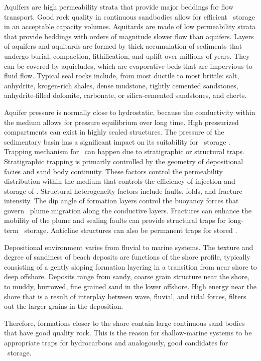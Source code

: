 Aquifers are high permeability strata that provide major beddings for flow transport. Good rock quality in continuous sandbodies allow for efficient \coo\ storage in an acceptable capacity volumes. Aquitards are made of low permeability strata that provide beddings with orders of magnitude slower flow than aquifers. Layers of aquifers and aquitards are formed by thick accumulation of sediments that undergo burial, compaction, lithification, and uplift over millions of years. They can be covered by aquicludes, which are evaporative beds that are impervious to fluid flow. Typical seal rocks include, from most ductile to most brittle: salt, anhydrite, krogen-rich shales, dense mudstone, tightly cemented sandstones, anhydrite-filled dolomite, carbonate, or silica-cemented sandstones, and cherts.

Aquifer pressure is normally close to hydrostatic, because the conductivity within the medium allows for pressure equilibrium over long time. High pressurized compartments can exist in highly sealed structures. The pressure of the sedimentary basin has a significant impact on its suitability for \coo\ storage \cite{bachu2000sequestration}. Trapping mechanism for \coo\ can happen due to stratigraphic or structural traps. Stratigraphic trapping  is primarily controlled by the geometry of depositional facies and sand body continuity. These factors control the permeability distribution within the medium that controls the efficiency of injection and storage of \coo. Structural heterogeneity factors include faults, folds, and fracture intensity. The dip angle of formation layers control the buoyancy forces that govern \coo\ plume migration along the conductive layers. Fractures can enhance the mobility of the plume and sealing faults can provide structural traps for long-term \coo\ storage. Anticline structures can also be permanent traps for stored \coo.

Depositional environment varies from fluvial to marine systems. The texture and degree of sandiness of beach deposits are functions of the shore profile, typically consisting of a gently sloping formation layering in a transition from near shore to deep offshore. Deposits range from sandy, coarse grain structure near the shore, to muddy, burrowed, fine grained sand in the lower offshore. High energy near the shore that is a result of interplay between wave, fluvial, and tidal forces, filters out the larger grains in the deposition.

Therefore, formations closer to the shore contain large continuous sand bodies that have good quality rock. This is the reason for shallow-marine systems to be appropriate traps for hydrocarbons and analogously, good candidates for \coo\ storage.

